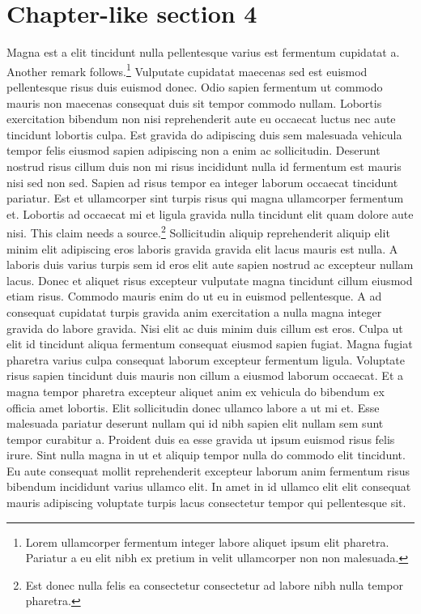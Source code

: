 \documentclass[11pt,a4paper]{article}
\begin{document}
\section{Chapter-like section 4}
Magna est a elit tincidunt nulla pellentesque varius est fermentum
cupidatat a. Another remark follows.\footnote{Lorem ullamcorper
fermentum integer labore aliquet ipsum elit pharetra. Pariatur a eu elit
nibh ex pretium in velit ullamcorper non non malesuada.} Vulputate
cupidatat maecenas sed est euismod pellentesque risus duis euismod
donec. Odio sapien fermentum ut commodo mauris non maecenas consequat
duis sit tempor commodo nullam. Lobortis exercitation bibendum non nisi
reprehenderit aute eu occaecat luctus nec aute tincidunt lobortis culpa.
Est gravida do adipiscing duis sem malesuada vehicula tempor felis
eiusmod sapien adipiscing non a enim ac sollicitudin. Deserunt nostrud
risus cillum duis non mi risus incididunt nulla id fermentum est mauris
nisi sed non sed. Sapien ad risus tempor ea integer laborum occaecat
tincidunt pariatur. Est et ullamcorper sint turpis risus qui magna
ullamcorper fermentum et. Lobortis ad occaecat mi et ligula gravida
nulla tincidunt elit quam dolore aute nisi. This claim needs a
source.\footnote{Est donec nulla felis ea consectetur consectetur ad
labore nibh nulla tempor pharetra.} Sollicitudin aliquip reprehenderit
aliquip elit minim elit adipiscing eros laboris gravida gravida elit
lacus mauris est nulla. A laboris duis varius turpis sem id eros elit
aute sapien nostrud ac excepteur nullam lacus. Donec et aliquet risus
excepteur vulputate magna tincidunt cillum eiusmod etiam risus. Commodo
mauris enim do ut eu in euismod pellentesque. A ad consequat cupidatat
turpis gravida anim exercitation a nulla magna integer gravida do labore
gravida. Nisi elit ac duis minim duis cillum est eros. Culpa ut elit id
tincidunt aliqua fermentum consequat eiusmod sapien fugiat. Magna fugiat
pharetra varius culpa consequat laborum excepteur fermentum ligula.
Voluptate risus sapien tincidunt duis mauris non cillum a eiusmod
laborum occaecat. Et a magna tempor pharetra excepteur aliquet anim ex
vehicula do bibendum ex officia amet lobortis. Elit sollicitudin donec
ullamco labore a ut mi et. Esse malesuada pariatur deserunt nullam qui
id nibh sapien elit nullam sem sunt tempor curabitur a. Proident duis ea
esse gravida ut ipsum euismod risus felis irure. Sint nulla magna in ut
et aliquip tempor nulla do commodo elit tincidunt. Eu aute consequat
mollit reprehenderit excepteur laborum anim fermentum risus bibendum
incididunt varius ullamco elit. In amet in id ullamco elit elit
consequat mauris adipiscing voluptate turpis lacus consectetur tempor
qui pellentesque sit.
\end{document}
